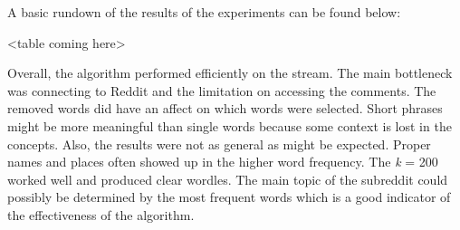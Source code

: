 \documentclass[12pt]{article}
\numberwithin{equation}{section}
\begin{document}
A basic rundown of the results of the experiments can be found below:

<table coming here>


Overall, the algorithm performed efficiently on the stream.  The main bottleneck was connecting to Reddit and the limitation on accessing the comments.  The removed words did have an affect on which words were selected.  Short phrases might be more meaningful than single words because some context is lost in the concepts.  Also, the results were not as general as might be expected.  Proper names and places often showed up in the higher word frequency.  The \textit{k} = 200 worked well and produced clear wordles.  The main topic of the subreddit could possibly be determined by the most frequent words which is a good indicator of the effectiveness of the algorithm.   
\end{document}
